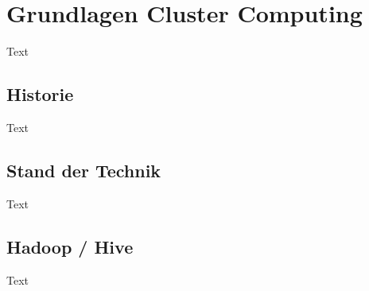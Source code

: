 \newpage
\section{Grundlagen Cluster Computing}
Text

\subsection{Historie}
Text

\subsection{Stand der Technik}
Text

\subsection{Hadoop / Hive}
Text
